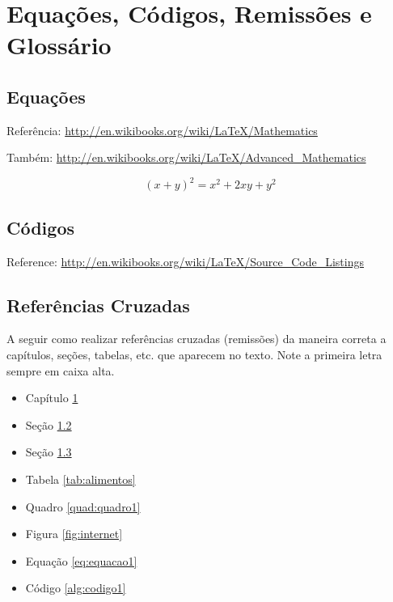 
\chapter{Equações, Códigos,  Remissões e Glossário}\label{chp:capitulo4}

  \section{Equações}\label{sec:equacoes}
    Referência: \url{http://en.wikibooks.org/wiki/LaTeX/Mathematics}

    Também: \url{http://en.wikibooks.org/wiki/LaTeX/Advanced_Mathematics}

    \begin{equation}\label{eq:equacao1}
      (x + y)^2 = x^2 + 2xy + y^2
    \end{equation}

  \section{Códigos}\label{sec:codigos}
    Reference: \url{http://en.wikibooks.org/wiki/LaTeX/Source_Code_Listings}




  \section{Referências Cruzadas} \label{sec:referencias}

    A seguir como realizar referências cruzadas (remissões) da maneira correta a capítulos, seções, tabelas, etc. que aparecem no texto. Note a primeira letra sempre em caixa alta.

    \begin{itemize}
      \item Capítulo \ref{chp:capitulo4}
      \item Seção \ref{sec:codigos}
      \item Seção \ref{sec:referencias}
      \item Tabela \ref{tab:alimentos}
      \item Quadro \ref{quad:quadro1}
      \item Figura \ref{fig:internet}
      \item Equação \ref{eq:equacao1}
      \item Código \ref{alg:codigo1}
    \end{itemize}

